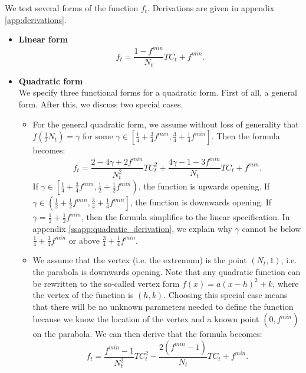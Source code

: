 \documentclass[12pt]{article}
\begin{document}
	We test several forms of the function $f_t$. Derivations are given in appendix \ref{app:derivations}.
	\begin{itemize}
		\item \textbf{Linear form}
		    \begin{equation} \label{eq:linear_functional_form}
		        f_t = \frac{1-f^{min}}{N_t}TC_t + f^{min}.
		    \end{equation}
    		
    	\item \textbf{Quadratic form}\\
    	We specify three functional forms for a quadratic form. First of all, a general form. After this, we discuss two special cases.
    	    \begin{itemize}
    	        \item For the general quadratic form, we assume without loss of generality that $f\left(\frac{1}{2}N_t\right) = \gamma$ for some $\gamma \in \left[\frac{1}{4} + \frac{3}{4}f^{min}, \frac{3}{4} + \frac{1}{4} f^{min}\right]$. Then the formula becomes:
    	            \begin{equation} \label{eq:quadratic_functional_form}
    	                f_t = \frac{2 - 4\gamma + 2f^{min}}{N_t^2}TC_t^2 + \frac{4\gamma - 1 - 3f^{min}}{N_t}TC_t + f^{min}.
    	            \end{equation}
		        If $\gamma \in \left[\frac{1}{4} + \frac{3}{4}f^{min}, \frac{1}{2} + \frac{1}{2}f^{min}\right)$, the function is upwards opening. If $\gamma \in \left(\frac{1}{2} + \frac{1}{2}f^{min}, \frac{3}{4} + \frac{1}{4} f^{min}\right]$, the function is downwards opening. If $\gamma = \frac{1}{2} + \frac{1}{2}f^{min}$, then the formula simplifies to the linear specification. In appendix \ref{ssapp:quadratic_derivation}, we explain why $\gamma$ cannot be below $\frac{1}{4} + \frac{3}{4}f^{min}$ or above $\frac{3}{4} + \frac{1}{4} f^{min}$.
		        
		        \item  We assume that the vertex (i.e. the extremum) is the point $(N_t, 1)$, i.e. the parabola is downwards opening. Note that any quadratic function can be rewritten to the so-called vertex form $f(x) = a(x - h)^2 + k$, where the vertex of the function is $(h, k)$. Choosing this special case means that there will be no unknown parameters needed to define the function because we know the location of the vertex and a known point $(0, f^{min})$ on the parabola. We can then derive that the formula becomes:
		            \begin{equation} \label{eq:quadratic_downwards_functional_form}
		                f_t = \frac{f^{min}-1}{N_t^2}TC_t^2 - \frac{2(f^{min}-1)}{N_t}TC_t + f^{min}.
		            \end{equation}
		        

\end{itemize}
\end{itemize}
\end{document}
